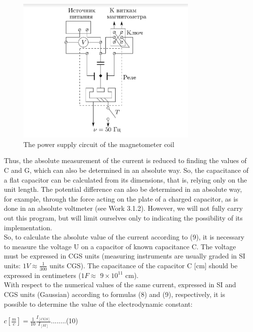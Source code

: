 \documentclass[a4paper, 12pt]{article}%
\begin{document}
\begin{figure}[h]
\begin{center}
\includegraphics[width = 0.8\textwidth]{Fig3.png}
\caption{The power supply circuit of the magnetometer coil}
\end{center}
\end{figure}
Thus, the absolute measurement of the current is reduced to finding the values of C and G, which can also be determined in an absolute way. So, the capacitance of a flat capacitor can be calculated from its dimensions, that is, relying only on the unit length. The potential difference can also be determined in an absolute way, for example, through the force acting on the plate of a charged capacitor, as is done in an absolute voltmeter (see Work 3.1.2). However, we will not fully carry out this program, but will limit ourselves only to indicating the possibility of its implementation.\\
So, to calculate the absolute value of the current according to (9), it is necessary to measure the voltage U on a capacitor of known capacitance C. The voltage must be expressed in CGS units (measuring instruments are usually graded in SI units: $1V \approx \frac{1}{300}$ units CGS). The capacitance of the capacitor C [cm] should be expressed in centimeters ($1F \approx$ $9 \times 10^{11}$ cm).\\
With respect to the numerical values of the same current, expressed in SI and CGS units (Gaussian) according to formulas (8) and (9), respectively, it is possible to determine the value of the electrodynamic constant:


\begin{center}
$c[\frac{m}{c}]= \frac{1}{10}\frac{I_{[CGS]}}{I_{[SI]}}$........(10)
\end{center}
\end{document}
